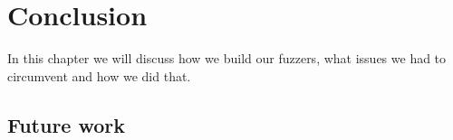 \chapter{Conclusion}
\label{cha:x}
In this chapter we will discuss how we build our fuzzers, what issues we had to circumvent and how we did that. 



\section{Future work}



